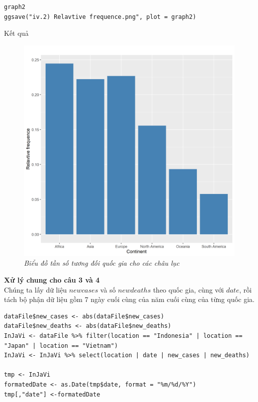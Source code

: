 \documentclass[a4paper]{article}
\theoremstyle{definition}
\begin{document}
\begin{enumerate}[1)]
\begin{lstlisting}
graph2
ggsave("iv.2) Relavtive frequence.png", plot = graph2)
\end{lstlisting}
Kết quả
    \begin{figure}[H]
        \begin{center}
            \includegraphics[scale=0.7]{iv/iv.2) Relavtive frequence.png}
        \end{center}
        \vspace{+3mm}\caption{\it Biểu đồ tần số tương đối quốc gia cho các châu lục}
    \end{figure}
    
{\bf Xử lý chung cho câu 3 và 4}  \\
Chúng ta lấy dữ liệu $new cases$ và số $new deaths$ theo quốc gia, cùng với $date$, rồi tách bộ phận dữ liệu gồm 7 ngày cuối cùng của năm cuối cùng của từng quốc gia.
\begin{lstlisting}
dataFile$new_cases <- abs(dataFile$new_cases)
dataFile$new_deaths <- abs(dataFile$new_deaths)
InJaVi <- dataFile %>% filter(location == "Indonesia" | location == "Japan" | location == "Vietnam")
InJaVi <- InJaVi %>% select(location | date | new_cases | new_deaths)

tmp <- InJaVi
formatedDate <- as.Date(tmp$date, format = "%m/%d/%Y")
tmp[,"date"] <-formatedDate


\end{lstlisting}
\end{enumerate}
\end{document}
